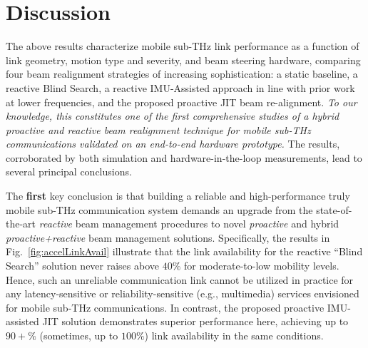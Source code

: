 \documentclass[fleqn,10pt]{wlscirep}
\begin{document}
\section*{Discussion}

The above results characterize mobile sub-THz link performance as a function of link geometry, motion type and severity, and beam steering hardware, comparing four beam realignment strategies of increasing sophistication: a static baseline, a reactive Blind Search, a reactive IMU-Assisted approach in line with prior work at lower frequencies\cite{s141019622, Brambilla_2019}, and the proposed proactive JIT beam re-alignment. \emph{To our knowledge, this constitutes one of the first comprehensive studies of a hybrid proactive and reactive beam realignment technique for mobile sub-THz communications validated on an end-to-end hardware prototype.} The results, corroborated by both simulation and hardware-in-the-loop measurements, lead to several principal conclusions.

The \textbf{first} key conclusion is that building a reliable and high-performance truly mobile sub-THz communication system demands an upgrade from the state-of-the-art \emph{reactive} beam management procedures to novel \emph{proactive} and hybrid \emph{proactive+reactive} beam management solutions. Specifically, the results in Fig.~\ref{fig:accelLinkAvail} illustrate that the link availability for the reactive ``Blind Search'' solution never raises above $40\%$ for moderate-to-low mobility levels. Hence, such an unreliable communication link cannot be utilized in practice for any latency-sensitive or reliability-sensitive (e.g., multimedia) services envisioned for mobile sub-THz communications. In contrast, the proposed proactive IMU-assisted JIT solution demonstrates superior performance here, achieving up to $90+\%$ (sometimes, up to $100\%$) link availability in the same conditions.
\end{document}
